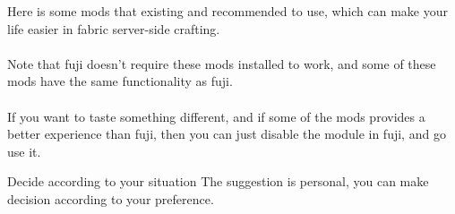 \label{ch:suggestion}



Here is some mods that existing and recommended to use, which can make your life easier in fabric server-side crafting.\\
\\
Note that fuji doesn't require these mods installed to work, and some of these mods have the same functionality as fuji.\\
\\
If you want to taste something different, and if some of the mods provides a better experience than fuji, then you can just disable the module in fuji, and go use it.

\begin{tips}{Decide according to your situation}
    The suggestion is personal, you can make decision according to your preference.
\end{tips}

\clearpage

